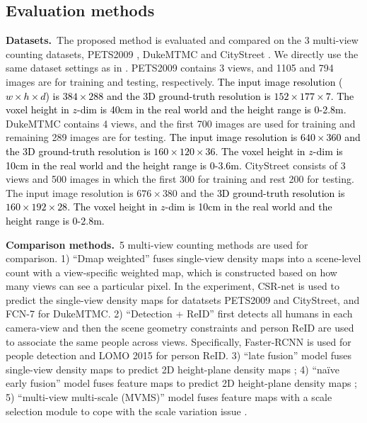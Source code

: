 \documentclass[letterpaper]{article}
\newcommand{\zq}[1]{\textcolor{black}{#1}} %
\newcommand{\citep}{\cite}
\newcommand{\citealp}[1]{\citeauthor{#1} \citeyear{#1}}
\begin{document}
\subsection{Evaluation methods}
\textbf{Datasets.}~The proposed method is evaluated and compared on the 3 multi-view counting datasets, PETS2009 \citep{ferryman2009pets2009}, DukeMTMC \citep{ristani2016MTMC} and CityStreet \citep{zhang2019wide}. We directly use the same dataset settings as in \citealp{zhang2019wide}.
PETS2009 contains 3 views,
and 1105 and 794 images are for training and testing, respectively.
\zq{The input image resolution ($w \! \times \! h \! \times \! d$) is  $384\! \times \!288$ and the 3D ground-truth resolution is $152\!\times\!177 \!\times\! 7$. The voxel height in $z$-dim is 40cm in the real world and the height range is 0-2.8m.}
DukeMTMC \citep{ristani2016MTMC} contains 4 views, and the first 700 images are used for training and remaining 289 images are for testing. \zq{The input image resolution is  $640\! \times \!360$ and the 3D ground-truth resolution is $160\!\times\!120 \!\times\! 36$. The voxel height in $z$-dim is 10cm in the real world and the height range is 0-3.6m.
}
CityStreet \citep{zhang2019wide} consists of 3 views and 500 images in which the first 300 for training and rest 200 for testing. The input image resolution is  $676\! \times \!380$ and the \zq{3D ground-truth resolution is $160\!\times\!192 \!\times\! 28$. The voxel height in $z$-dim is 10cm in the real world and the height range is 0-2.8m.}

\textbf{Comparison methods.}~5 multi-view counting methods are used for comparison.
1) ``Dmap weighted'' fuses single-view density maps into a scene-level count with a view-specific weighted map, which is constructed based on how many views can see a particular pixel. In the experiment, CSR-net \citep{li2018csrnet} is used to predict the single-view density maps for datatsets PETS2009 and CityStreet, and FCN-7 for DukeMTMC.
2) ``Detection + ReID''  first detects all humans in each camera-view and then the scene geometry constraints and person ReID are used to associate the same people across views. Specifically, Faster-RCNN \citep{ren2015faster} is used for people detection and LOMO 2015 \citep{liao2015person} for person ReID.
3) ``late fusion'' model fuses single-view density maps to predict 2D height-plane density maps \citep{zhang2019wide};
4) ``na\"ive early fusion'' model fuses feature maps to predict 2D height-plane density maps \citep{zhang2019wide};
5) ``multi-view multi-scale (MVMS)'' model fuses feature maps with a scale selection module to cope with the scale variation issue \citep{zhang2019wide}.
\end{document}
